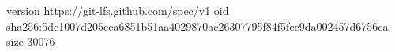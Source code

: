 version https://git-lfs.github.com/spec/v1
oid sha256:5dc1007d205cca6851b51aa4029870ac26307795f84f5fcc9da002457d6756ca
size 30076
